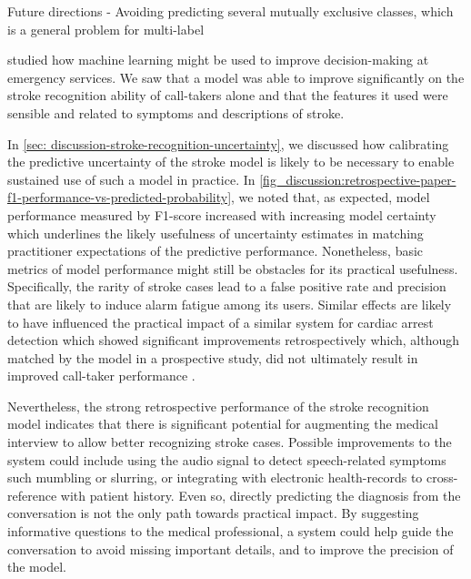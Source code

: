 \vspace{1em}
\textbf{} 

Future directions
- Avoiding predicting several mutually exclusive classes, which is a general problem for multi-label 


\vspace{1em}
\textbf{} studied how machine learning might be used to improve decision-making at emergency services. 
We saw that a model was able to improve significantly on the stroke recognition ability of call-takers alone and that the features it used were sensible and related to symptoms and descriptions of stroke. 

In \cref{sec: discussion-stroke-recognition-uncertainty}, we discussed how calibrating the predictive uncertainty of the stroke model is likely to be necessary to enable sustained use of such a model in practice. In \cref{fig_discussion:retrospective-paper-f1-performance-vs-predicted-probability}, we noted that, as expected, model performance measured by F1-score increased with increasing model certainty which underlines the likely usefulness of uncertainty estimates in matching practitioner expectations of the predictive performance. 
Nonetheless, basic metrics of model performance might still be obstacles for its practical usefulness. Specifically, the rarity of stroke cases lead to a false positive rate and precision that are likely to induce alarm fatigue among its users. Similar effects are likely to have influenced the practical impact of a similar system for cardiac arrest detection which showed significant improvements retrospectively \parencite{cite14} which, although matched by the model in a prospective study, did not ultimately result in improved call-taker performance \parencite{cite15}. 

Nevertheless, the strong retrospective performance of the stroke recognition model indicates that there is significant potential for augmenting the medical interview to allow better recognizing stroke cases. 
Possible improvements to the system could include using the audio signal to detect speech-related symptoms such mumbling or slurring, or integrating with electronic health-records to cross-reference with patient history. 
Even so, directly predicting the diagnosis from the conversation is not the only path towards practical impact. By suggesting informative questions to the medical professional, a system could help guide the conversation to avoid missing important details, and to improve the precision of the model. 



